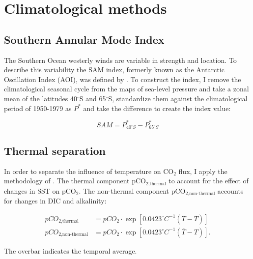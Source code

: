 \section{Climatological methods}

\subsection{Southern Annular Mode Index}
\label{sec:sam}
The Southern Ocean westerly winds are variable in strength and location. To describe this variability the \ac{SAM} index, formerly known as the Antarctic Oscillation Index (AOI), was defined by \cite{Gong1999}. To construct the index, I remove the climatological seasonal cycle from the maps of sea-level pressure and take a zonal mean of the latitudes 40$^\circ$S and 65$^\circ$S, standardize them against the climatological period of 1950-1979 as $P^*$ and take the difference to create the index value:

\[ SAM={P}^*_{40^{\circ}S} - {P}^*_{65^{\circ}S}\] 

\subsection{Thermal separation}
\label{sec:takahashi}
In order to separate the influence of temperature on CO$_2$ flux, I apply the methodology of \cite{Takahashi1993,Takahashi2002}. The thermal component pCO$_{\text{2,thermal}}$ to account for the effect of changes in \ac{SST} on pCO$_2$. The non-thermal component pCO$_{\text{2,non-thermal}}$ accounts for changes in \acs{DIC} and alkalinity:

\begin{align*}
pCO_{\text{2,thermal}}&=\overline{pCO_2} \cdot \exp \left[ 0.0423 ^{\circ}C^{-1}\left( T - \overline{T} \right) \right] \\
pCO_{\text{2,non-thermal}}&=pCO_2 \cdot \exp \left[ 0.0423 ^{\circ}C^{-1}\left( \overline{T} - T \right) \right].
\end{align*}

\noindent The overbar indicates the temporal average.